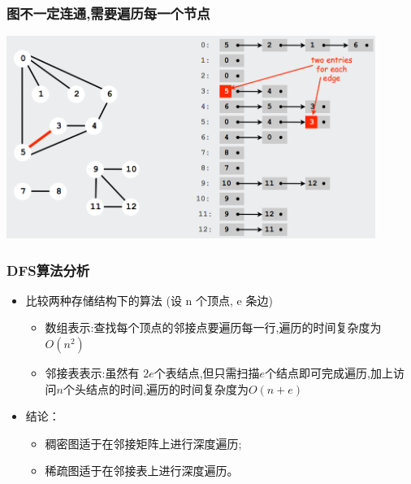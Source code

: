 \begin{frame}[fragile]
  \frametitle{图不一定连通,需要遍历每一个节点}
  \includegraphics[width=0.9\textwidth]{figs/graph_dfs.png}
\end{frame}

\begin{frame}[fragile]
  \frametitle{DFS算法分析}
  \begin{itemize}
  \item 比较两种存储结构下的算法 (设 n 个顶点, e 条边)
    \begin{itemize}
    \item 数组表示:查找每个顶点的邻接点要遍历每一行,遍历的时间复杂度为$O(n^2)$
    \item 邻接表表示:虽然有 $2e$个表结点,但只需扫描$e$个结点即可完成遍历,加上访
      问$n$个头结点的时间,遍历的时间复杂度为$O(n+e)$
    \end{itemize}
  \item 结论：
    \begin{itemize}
    \item 稠密图适于在邻接矩阵上进行深度遍历;
    \item 稀疏图适于在邻接表上进行深度遍历。
    \end{itemize}
  \end{itemize}
\end{frame}

